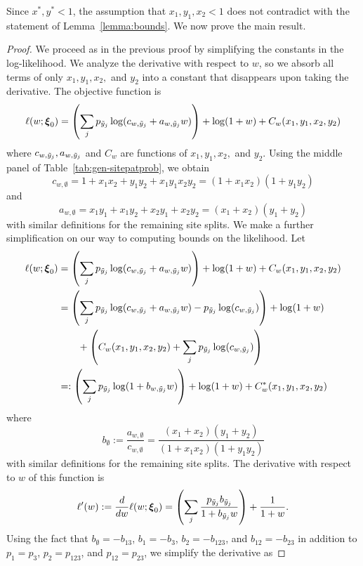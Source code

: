 Since $x^*, y^* < 1$, the assumption that $x_1,y_1,x_2 < 1$ does not contradict with the statement of Lemma~\ref{lemma:bounds}.
We now prove the main result.

\topoInconsist*

\begin{proof}
We proceed as in the previous proof by simplifying the constants in the log-likelihood.
We analyze the derivative with respect to $w$, so we absorb all terms of only $x_1,y_1,x_2,$ and $y_2$ into a constant that disappears upon taking the derivative.
The objective function is
\begin{align*}
\ell(w; \boldsymbol\xi_0) = \left(\sum_j p_{\tilde{y}_j} \log(c_{w,\tilde{y}_j} + a_{w,\tilde{y}_j}w)\right) + \log(1+w) + C_w(x_1,y_1,x_2,y_2)
\end{align*}
where $c_{w,\tilde{y}_j},a_{w,\tilde{y}_j}$ and $C_w$ are functions of $x_1,y_1,x_2,$ and $y_2$.
Using the middle panel of Table~\ref{tab:gen-sitepatprob}, we obtain
\[
c_{w,\emptyset} = 1+x_1x_2+y_1y_2+x_1y_1x_2y_2 = (1+x_1x_2)(1+y_1y_2)
\]
and
\[
a_{w,\emptyset} = x_1y_1+x_1y_2+x_2y_1+x_2y_2 = (x_1+x_2)(y_1+y_2)
\]
with similar definitions for the remaining site splits.
We make a further simplification on our way to computing bounds on the likelihood.
Let
\begin{align*}
\ell(w; \boldsymbol\xi_0) &= \left(\sum_j p_{\tilde{y}_j} \log(c_{w,\tilde{y}_j} + a_{w,\tilde{y}_j}w)\right) + \log(1+w) + C_w(x_1,y_1,x_2,y_2) \\
        &= \left(\sum_j p_{\tilde{y}_j} \log(c_{w,\tilde{y}_j} + a_{w,\tilde{y}_j}w) - p_{\tilde{y}_j} \log(c_{w,\tilde{y}_j})\right) + \log(1+w) \\
        &\qquad + \left(C_w(x_1,y_1,x_2,y_2) + \sum_j p_{\tilde{y}_j} \log(c_{w,\tilde{y}_j})\right) \\
        &=: \left(\sum_j p_{\tilde{y}_j} \log(1 + b_{w,\tilde{y}_j}w)\right) + \log(1+w) + C^*_w(x_1,y_1,x_2,y_2)
\end{align*}
where
\[
b_{\emptyset} := \frac{a_{w,\emptyset}}{c_{w,\emptyset}} = \frac{(x_1+x_2)(y_1+y_2)}{(1+x_1x_2)(1+y_1y_2)}
\]
with similar definitions for the remaining site splits.
The derivative with respect to $w$ of this function is
\begin{align*}
\ell'(w) := \frac{d}{dw} \ell(w; \boldsymbol\xi_0) =  \left(\sum_j \frac{p_{\tilde{y}_j}b_{\tilde{y}_j}}{1 + b_{\tilde{y}_j}w}\right) + \frac{1}{1+w}.
\end{align*}
Using the fact that $b_{\emptyset} = -b_{13}$, $b_{1} = -b_{3}$, $b_{2} = -b_{123}$, and $b_{12} = -b_{23}$ in addition to $p_{1} = p_{3}$, $p_{2} = p_{123}$, and $p_{12} = p_{23}$, we simplify the derivative as

\end{proof}
